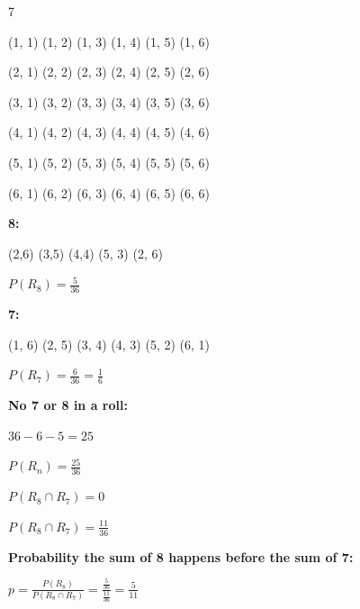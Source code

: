 \documentclass[12 pt]{article}
\begin{document}
    \begin{exercise}{7}
    \hfill

    (1, 1) (1, 2) (1, 3) (1, 4) (1, 5) (1, 6)

    (2, 1) (2, 2) (2, 3) (2, 4) (2, 5) (2, 6)

    (3, 1) (3, 2) (3, 3) (3, 4) (3, 5) (3, 6)

    (4, 1) (4, 2) (4, 3) (4, 4) (4, 5) (4, 6)

    (5, 1) (5, 2) (5, 3) (5, 4) (5, 5) (5, 6)

    (6, 1) (6, 2) (6, 3) (6, 4) (6, 5) (6, 6)

    \hfill

    \textbf{8:}

    (2,6) (3,5) (4,4) (5, 3) (2, 6)

    $P(R_8) = \frac{5}{36}$

    \hfill

    \textbf{7:}

    (1, 6) (2, 5) (3, 4) (4, 3) (5, 2) (6, 1)

    $P(R_7) = \frac{6}{36} = \frac{1}{6}$

    \hfill

    \textbf{No 7 or 8 in a roll:}

    $36 - 6 - 5 = 25$

    $P(R_n) = \frac{25}{36}$

    \hfill

    $P(R_8 \cap R_7) = 0$

    $P(R_8 \cap R_7) = \frac{11}{36}$

    \hfill

    \textbf{Probability the sum of 8 happens before the sum of 7:}

    $p = \frac{P(R_8)}{P(R_8 \cap R_7)} = \frac{\frac{5}{36}}{\frac{11}{36}} = \frac{5}{11}$
    \end{exercise}
\end{document}
